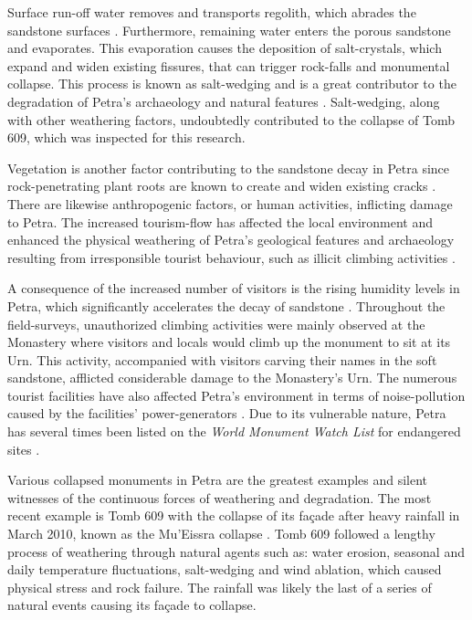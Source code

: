 Surface run-off water removes and transports regolith, which abrades the sandstone surfaces \parencites[650--668]{heinrichs2008}[1130--1131]{papamichos2010}[207--208]{paradise1995}.
Furthermore, remaining water enters the porous sandstone and evaporates.
This evaporation causes the deposition of salt-crystals, which expand and widen existing fissures,
that can trigger rock-falls and monumental collapse.
This process is known as salt-wedging and is a great contributor to the degradation of Petra’s archaeology and
natural features \parencites[90]{nichols2009}[66]{usicomos1996}.
Salt-wedging, along with other weathering factors, undoubtedly contributed to the collapse of Tomb 609, which was inspected for this research. 

Vegetation is another factor contributing to the sandstone decay in Petra since rock-penetrating plant roots are known to
create and widen existing cracks  \parencites[125--126]{alshawabkehy2010}[230--242]{turkington2005}[66]{usicomos1996}.
There are likewise anthropogenic factors, or human activities, inflicting damage to Petra.
The increased tourism-flow has affected the local environment and enhanced the physical weathering of Petra’s geological features and
archaeology resulting from irresponsible tourist behaviour, such as illicit climbing activities \parencite[90]{mustafa2011}.

A consequence of the increased number of visitors is the rising humidity levels in Petra,
which significantly accelerates the decay of sandstone \parencite[75--76]{paradise2010}.
Throughout the field-surveys, unauthorized climbing activities were mainly observed at the Monastery where visitors and
locals would climb up the monument to sit at its Urn.
This activity, accompanied with visitors carving their names in the soft sandstone, afflicted considerable damage to the Monastery’s Urn.
The numerous tourist facilities have also affected Petra’s environment in terms of noise-pollution caused by
the facilities’ power-generators \parencite[88]{assante1993}.
Due to its vulnerable nature, Petra has several times been listed on the \emph{World Monument Watch List} for
endangered sites \parencites[58--62]{comer2012}[643]{heinrichs2008}[16]{paolini2012}{icomos2005}{worldmonumentsfund2017}.
 
Various  collapsed monuments in Petra are the greatest examples and silent witnesses of the continuous forces of weathering and degradation.
The most recent example is Tomb 609 with the collapse of its façade  after heavy rainfall in March 2010,
known as the Mu’Eissra collapse \parencite[583]{heinrichs2013b}.
Tomb 609 followed a lengthy process of weathering through natural agents such as: water erosion, seasonal and daily temperature fluctuations,
salt-wedging and wind ablation, which caused physical stress and rock failure.
The rainfall was likely the last of a series of natural events causing its façade to collapse.

